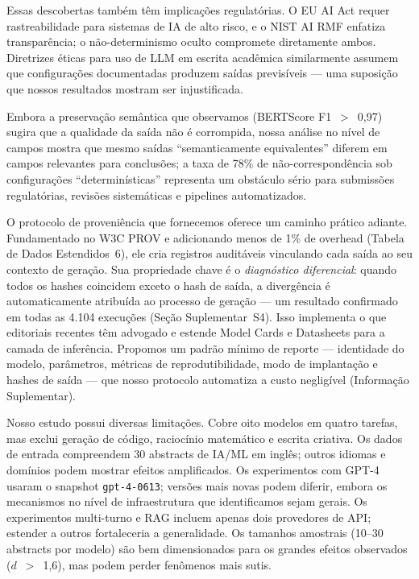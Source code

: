 \documentclass[12pt,a4paper]{article}
\begin{document}
Essas descobertas também têm implicações regulatórias.
O EU AI Act requer rastreabilidade para sistemas de IA de alto risco, e o NIST AI RMF enfatiza transparência; o não-determinismo oculto compromete diretamente ambos.
Diretrizes éticas para uso de LLM em escrita acadêmica similarmente assumem que configurações documentadas produzem saídas previsíveis --- uma suposição que nossos resultados mostram ser injustificada.

Embora a preservação semântica que observamos (BERTScore F1~$>$~0,97) sugira que a qualidade da saída não é corrompida, nossa análise no nível de campos mostra que mesmo saídas ``semanticamente equivalentes'' diferem em campos relevantes para conclusões; a taxa de 78\% de não-correspondência sob configurações ``determinísticas'' representa um obstáculo sério para submissões regulatórias, revisões sistemáticas e pipelines automatizados.

O protocolo de proveniência que fornecemos oferece um caminho prático adiante.
Fundamentado no W3C PROV e adicionando menos de 1\% de overhead (Tabela de Dados Estendidos~6), ele cria registros auditáveis vinculando cada saída ao seu contexto de geração.
Sua propriedade chave é o \emph{diagnóstico diferencial}: quando todos os hashes coincidem exceto o hash de saída, a divergência é automaticamente atribuída ao processo de geração --- um resultado confirmado em todas as 4.104 execuções (Seção Suplementar~S4).
Isso implementa o que editoriais recentes têm advogado e estende Model Cards e Datasheets para a camada de inferência.
Propomos um padrão mínimo de reporte --- identidade do modelo, parâmetros, métricas de reprodutibilidade, modo de implantação e hashes de saída --- que nosso protocolo automatiza a custo negligível (Informação Suplementar).

Nosso estudo possui diversas limitações.
Cobre oito modelos em quatro tarefas, mas exclui geração de código, raciocínio matemático e escrita criativa.
Os dados de entrada compreendem 30 abstracts de IA/ML em inglês; outros idiomas e domínios podem mostrar efeitos amplificados.
Os experimentos com GPT-4 usaram o snapshot \texttt{gpt-4-0613}; versões mais novas podem diferir, embora os mecanismos no nível de infraestrutura que identificamos sejam gerais.
Os experimentos multi-turno e RAG incluem apenas dois provedores de API; estender a outros fortaleceria a generalidade.
Os tamanhos amostrais (10--30 abstracts por modelo) são bem dimensionados para os grandes efeitos observados ($d$~$>$~1,6), mas podem perder fenômenos mais sutis.
\end{document}
